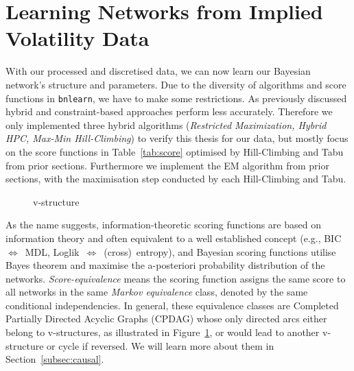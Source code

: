 \documentclass[twoside,twocolumn]{article}
\begin{document}
\section{Learning Networks from Implied Volatility Data}
With our processed and discretised data, we can now learn our Bayesian network's structure and parameters. Due to the diversity of algorithms and score functions in \texttt{bnlearn}, we have to make some restrictions. As previously discussed hybrid and constraint-based approaches perform less accurately. \cite{Scutari2019}  Therefore we only implemented three hybrid algorithms (\textit{Restricted Maximization, Hybrid HPC, Max-Min Hill-Climbing}) to verify this thesis for our data, but mostly focus on the score functions in Table~\ref{tab:score} optimised by Hill-Climbing and Tabu from prior sections. Furthermore we implement the EM algorithm from prior sections, with the maximisation step conducted by each Hill-Climbing and Tabu.

\begin{figure}
\begin{subfigure}{\linewidth}
  \centering
{}
 \end{subfigure}
 \caption[Markov Equivalence classes]{\small v-structure}
   \label{fig:vstructure}
\end{figure}


As the name suggests, information-theoretic scoring functions are based on information theory and often equivalent to a well established concept (e.g., BIC~$\Leftrightarrow$~MDL, Loglik~$\Leftrightarrow$~(cross)~entropy),  and Bayesian scoring functions utilise Bayes theorem and maximise the a-posteriori probability distribution of the networks. \cite{Carvalho2009} \cite{Scutari2022} 
\textit{Score-equivalence} means the scoring function assigns the same score to all networks in the same  \textit{Markov equivalence} class, denoted by the same conditional independencies. In general, these equivalence classes are Completed Partially Directed Acyclic Graphs (CPDAG) whose only directed arcs either belong to v-structures, as illustrated in Figure~\ref{fig:vstructure}, or would lead to another v-structure or cycle if reversed. We will learn more about them in Section~\ref{subsec:causal}. \cite{Nagarajan2014} \cite{Scutari2022} \cite{Castelletti2018}\\
\end{document}

